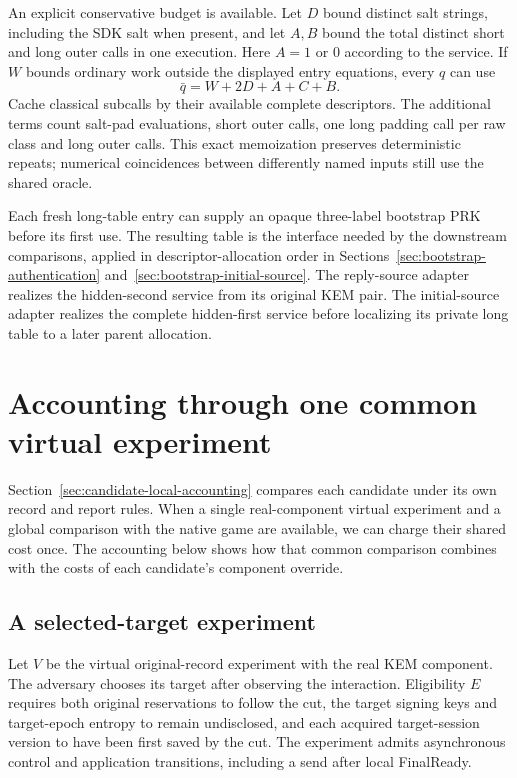 \documentclass[pdflatex]{sn-jnl}
\theoremstyle{thmstyleone}
\theoremstyle{thmstylethree}
\theoremstyle{thmstyletwo}
\begin{document}
An explicit conservative budget is available. Let $D$ bound distinct
salt strings, including the SDK salt when present, and let $A,B$ bound
the total distinct short and long outer calls in one execution. Here
$A=1$ or $0$ according to the service. If $W$ bounds ordinary work
outside the displayed entry equations, every $q$ can use
\[
 \bar q=W+2D+A+C+B.
\]
Cache classical subcalls by their available complete descriptors.
The additional terms count salt-pad evaluations, short outer calls,
one long padding call per raw class and long outer calls. This exact
memoization preserves deterministic repeats; numerical coincidences
between differently named inputs still use the shared oracle.

Each fresh long-table entry can supply an opaque three-label bootstrap PRK
before its first use. The resulting table is the interface needed by
the downstream comparisons, applied in descriptor-allocation order in
Sections~\ref{sec:bootstrap-authentication}
and~\ref{sec:bootstrap-initial-source}. The reply-source adapter realizes
the hidden-second service from its original KEM pair. The initial-source
adapter realizes the complete hidden-first service before localizing its
private long table to a later parent allocation.
\section{Accounting through one common virtual experiment}
\label{app:common-virtual}

Section~\ref{sec:candidate-local-accounting} compares each candidate
under its own record and report rules. When a single real-component
virtual experiment and a global comparison with the native game are
available, we can charge their shared cost once. The accounting below
shows how that common comparison combines with the costs of each
candidate's component override.

\subsection{A selected-target experiment}

Let $V$ be the virtual original-record experiment with the real KEM component.
The adversary chooses its target after observing the interaction.
Eligibility $E$ requires both original reservations to follow the cut,
the target signing keys and target-epoch entropy to remain undisclosed,
and each acquired target-session version to have been first saved by
the cut. The experiment admits asynchronous control and application
transitions, including a send after local FinalReady.
\end{document}

